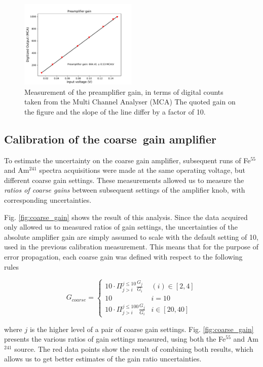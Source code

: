 \begin{figure}[htb]
  \includegraphics[scale=0.5,width=0.5\textwidth]{graphics/preamp_gain_calibration_plus_conversionfactor.pdf}
  \caption{Measurement of the preamplifier gain, in terms of digital counts taken from the Multi Channel Analyser (MCA) The quoted gain on the figure and the slope of the line differ by a factor of 10.}
  \label{fig:preamp_gain_mca}
\end{figure}


\subsection{Calibration of the coarse~gain amplifier}
\label{sec:coarse}
To estimate the uncertainty on the coarse gain amplifier, subsequent runs of Fe$^{55}$ and Am$^{241}$ spectra acquisitions were made at the same operating voltage, but different coarse gain settings. These measurements allowed us to measure the \textit{ratios of coarse gains} between subsequent settings of the amplifier knob, with corresponding uncertainties.

Fig. \ref{fig:coarse_gain} shows the result of this analysis. Since the data acquired only allowed us to measured ratios of gain settings, the uncertainties of the absolute amplifier gain are simply assumed to scale with the default setting of 10, used in the previous calibration measurement. This means that for the purpose of error propagation, each coarse gain was defined with respect to the following rules

$$
G_{coarse} = \left\{
\begin{array}{ll} 
  10\cdot\Pi_{j>i}^{j\leq10}\frac{G_{j}}{G_{i}} & (i) \in [2,4] \\
  10 & i=10 \\
  10\cdot\Pi_{j>i}^{j\leq 100}\frac{G_{j}}{G_{i}} & i \in [20,40] 
\end{array}
\right.
$$

where $j$ is the higher level of a pair of coarse gain settings. Fig. \ref{fig:coarse_gain} presents the various ratios of gain settings measured, using both the Fe$^{55}$ and Am$^{241}$ source. The red data points show the result of combining both results, which allows us to get better estimates of the gain ratio uncertainties.

